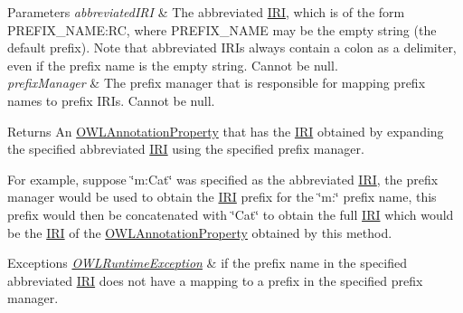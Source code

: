 \begin{DoxyParams}{Parameters}
{\em abbreviated\-I\-R\-I} & The abbreviated \hyperlink{classorg_1_1semanticweb_1_1owlapi_1_1model_1_1_i_r_i}{I\-R\-I}, which is of the form P\-R\-E\-F\-I\-X\-\_\-\-N\-A\-M\-E\-:R\-C, where P\-R\-E\-F\-I\-X\-\_\-\-N\-A\-M\-E may be the empty string (the default prefix). Note that abbreviated I\-R\-Is always contain a colon as a delimiter, even if the prefix name is the empty string. Cannot be null. \\
\hline
{\em prefix\-Manager} & The prefix manager that is responsible for mapping prefix names to prefix I\-R\-Is. Cannot be null. \\
\hline
\end{DoxyParams}
\begin{DoxyReturn}{Returns}
An \hyperlink{interfaceorg_1_1semanticweb_1_1owlapi_1_1model_1_1_o_w_l_annotation_property}{O\-W\-L\-Annotation\-Property} that has the \hyperlink{classorg_1_1semanticweb_1_1owlapi_1_1model_1_1_i_r_i}{I\-R\-I} obtained by expanding the specified abbreviated \hyperlink{classorg_1_1semanticweb_1_1owlapi_1_1model_1_1_i_r_i}{I\-R\-I} using the specified prefix manager. 
\end{DoxyReturn}
For example, suppose \char`\"{}m\-:\-Cat\char`\"{} was specified as the abbreviated \hyperlink{classorg_1_1semanticweb_1_1owlapi_1_1model_1_1_i_r_i}{I\-R\-I}, the prefix manager would be used to obtain the \hyperlink{classorg_1_1semanticweb_1_1owlapi_1_1model_1_1_i_r_i}{I\-R\-I} prefix for the \char`\"{}m\-:\char`\"{} prefix name, this prefix would then be concatenated with \char`\"{}\-Cat\char`\"{} to obtain the full \hyperlink{classorg_1_1semanticweb_1_1owlapi_1_1model_1_1_i_r_i}{I\-R\-I} which would be the \hyperlink{classorg_1_1semanticweb_1_1owlapi_1_1model_1_1_i_r_i}{I\-R\-I} of the \hyperlink{interfaceorg_1_1semanticweb_1_1owlapi_1_1model_1_1_o_w_l_annotation_property}{O\-W\-L\-Annotation\-Property} obtained by this method. 
\begin{DoxyExceptions}{Exceptions}
{\em \hyperlink{classorg_1_1semanticweb_1_1owlapi_1_1model_1_1_o_w_l_runtime_exception}{O\-W\-L\-Runtime\-Exception}} & if the prefix name in the specified abbreviated \hyperlink{classorg_1_1semanticweb_1_1owlapi_1_1model_1_1_i_r_i}{I\-R\-I} does not have a mapping to a prefix in the specified prefix manager. \\
\hline
\end{DoxyExceptions}
